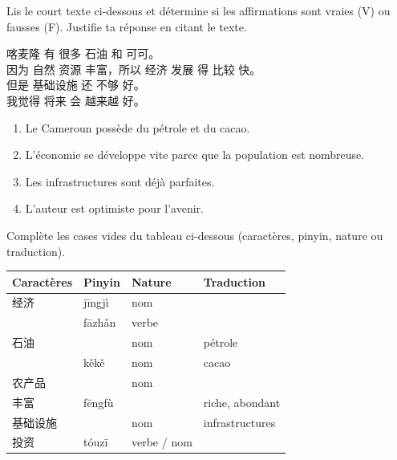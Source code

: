 \documentclass[11pt]{article}
\newcommand{\cle}[1]{{\popxbold\color{popdark}#1}}
\begin{document}
\begin{exercice}
Lis le court texte ci-dessous et détermine si les affirmations sont vraies (V) ou fausses (F). Justifie ta réponse en citant le texte.
\begin{textebox}
喀麦隆 有 很多 石油 和 可可。\\
因为 自然 资源 丰富，所以 经济 发展 得 比较 快。\\
但是 基础设施 还 不够 好。\\
我觉得 将来 会 越来越 好。
\end{textebox}
\begin{enumerate}
    \item Le Cameroun possède du pétrole et du cacao.
    \item L'économie se développe vite parce que la population est nombreuse.
    \item Les infrastructures sont déjà parfaites.
    \item L'auteur est optimiste pour l'avenir.
\end{enumerate}
\end{exercice}

\begin{exercice}
Complète les cases vides du tableau ci-dessous (caractères, pinyin, nature ou traduction).
\begin{center}
\begin{tabularx}{\linewidth}{|X|X|X|X|}
\hline
\rowcolor{popblueL} \textbf{Caractères} & \textbf{Pinyin} & \textbf{Nature} & \textbf{Traduction} \\
\hline
经济 & jīngjì & \cle{nom} &  \\
\hline
 & fāzhǎn & verbe &  \\
\hline
石油 &  & \cle{nom} & pétrole \\
\hline
 & kěkě & \cle{nom} & cacao \\
\hline
农产品 &  & \cle{nom} &  \\
\hline
丰富 & fēngfù &  & riche, abondant \\
\hline
基础设施 &  & \cle{nom} & infrastructures \\
\hline
投资 & tóuzī & verbe / nom &  \\
\hline
\end{tabularx}
\end{center}
\end{exercice}
\end{document}
